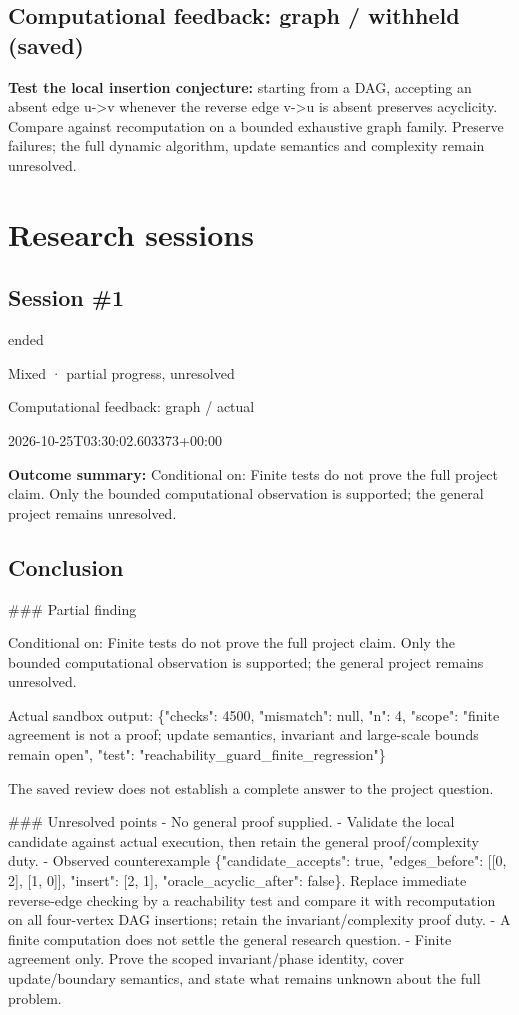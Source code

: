 \documentclass[11pt]{article}
\begin{document}
\subsection{Computational feedback: graph / withheld (saved)}
\textbf{Test the local insertion conjecture:} starting from a DAG, accepting an absent edge u-\textgreater{}v whenever the reverse edge v-\textgreater{}u is absent preserves acyclicity. Compare against recomputation on a bounded exhaustive graph family. Preserve failures; the full dynamic algorithm, update semantics and complexity remain unresolved.\par
\section{Research sessions}
\subsection{Session \#1}
\begin{description}[style=nextline,font=\normalfont\bfseries,leftmargin=0pt,labelsep=0pt]
\item[Execution status] ended
\item[Outcome] Mixed · partial progress, unresolved
\item[Strategy] Computational feedback: graph / actual
\item[Started] 2026-10-25T03:30:02.603373+00:00
\end{description}
\textbf{Outcome summary:} Conditional on: Finite tests do not prove the full project claim. Only the bounded computational observation is supported; the general project remains unresolved.\par
\subsection{Conclusion}
\#\#\# Partial finding

Conditional on: Finite tests do not prove the full project claim. Only the bounded computational observation is supported; the general project remains unresolved.

Actual sandbox output: \{"checks": 4500, "mismatch": null, "n": 4, "scope": "finite agreement is not a proof; update semantics, invariant and large-scale bounds remain open", "test": "reachability\_guard\_finite\_regression"\}

The saved review does not establish a complete answer to the project question.

\#\#\# Unresolved points
- No general proof supplied.
- Validate the local candidate against actual execution, then retain the general proof/complexity duty.
- Observed counterexample \{"candidate\_accepts": true, "edges\_before": [[0, 2], [1, 0]], "insert": [2, 1], "oracle\_acyclic\_after": false\}. Replace immediate reverse-edge checking by a reachability test and compare it with recomputation on all four-vertex DAG insertions; retain the invariant/complexity proof duty.
- A finite computation does not settle the general research question.
- Finite agreement only. Prove the scoped invariant/phase identity, cover update/boundary semantics, and state what remains unknown about the full problem.
\end{document}
